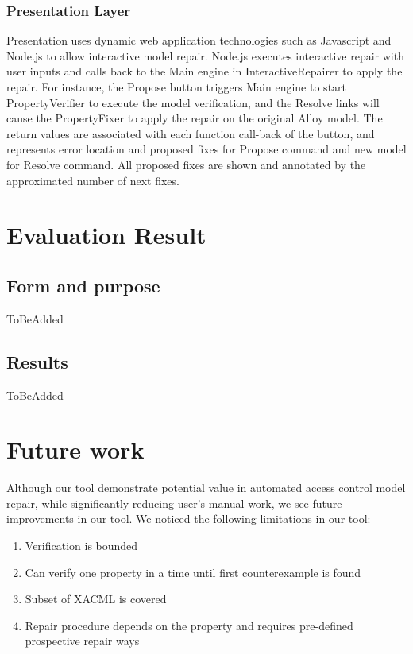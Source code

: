 \documentclass{acm_proc_article-sp}
\begin{document}
\subsubsection{Presentation Layer}
Presentation uses dynamic web application technologies such as Javascript and Node.js to allow interactive model repair. Node.js executes interactive repair with user inputs and calls back to the Main engine in InteractiveRepairer to apply the repair. For instance, the Propose button triggers Main engine to start PropertyVerifier to execute the model verification, and the Resolve links will cause the PropertyFixer to apply the repair on the original Alloy model. The return values are associated with each function call-back of the button, and represents error location and proposed fixes for Propose command and new model for Resolve command. All proposed fixes are shown and annotated by the approximated number of next fixes.

\section{Evaluation Result}

\subsection{Form and purpose}

ToBeAdded

\subsection{Results}
ToBeAdded

\section{Future work}

Although our tool demonstrate potential value in automated access control model repair, while significantly reducing user's manual work, we see future improvements in our tool. We noticed the following limitations in our tool:

\begin{enumerate}
\item Verification is bounded
\item Can verify one property in a time until first counterexample is found
\item Subset of XACML is covered
\item Repair procedure depends on the property and requires pre-defined prospective repair ways
\end{enumerate}
\end{document}
